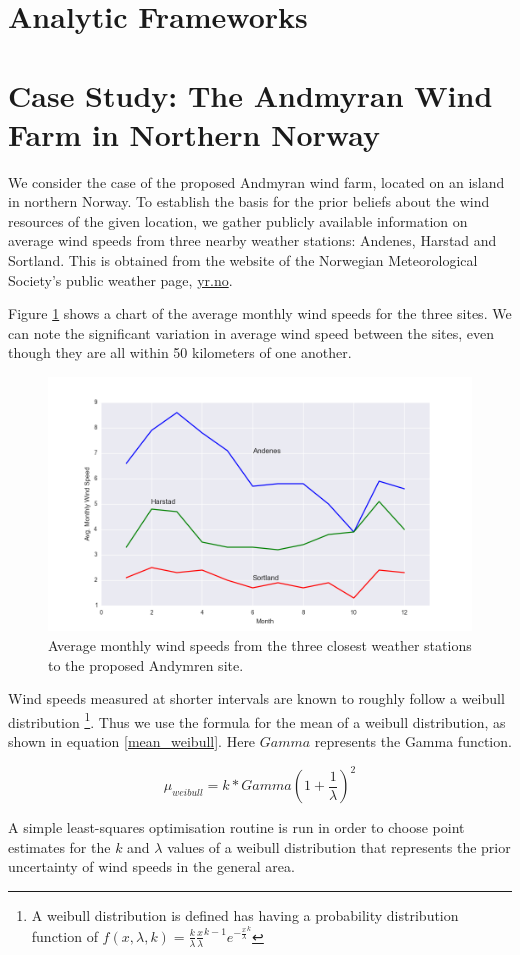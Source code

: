 \documentclass[11pt]{article}
\begin{document}
\section{Analytic Frameworks}


\section{Case Study: The Andmyran Wind Farm in Northern Norway}

We consider the case of the proposed Andmyran wind farm, located on an island in northern Norway. To establish the basis for the prior beliefs about the wind resources of the given location, we gather publicly available information on average wind speeds from three nearby weather stations: Andenes, Harstad and Sortland. This is obtained from the website of the Norwegian Meteorological Society's public weather page, \url{yr.no}. 

Figure \ref{avg_wind_speed_data} shows a chart of the average monthly wind speeds for the three sites. We can note the significant variation in average wind speed between the sites, even though they are all within 50 kilometers of one another. 

\begin{figure}
	\includegraphics[width=1\textwidth]{figures/avg_wind_speed_data.png}
	\caption{Average monthly wind speeds from the three closest weather stations to the proposed Andymren site.}
	\label{avg_wind_speed_data}
\end{figure}

Wind speeds measured at shorter intervals are known to roughly follow a weibull distribution \footnote{A weibull distribution is defined has having a probability distribution function of $f(x, \lambda, k) = \frac{k}{\lambda} \frac{x}{\lambda}^{k-1} e^{-\frac{x}{\lambda}^k}$}. Thus we use the formula for the mean of a weibull distribution, as shown in equation \ref{mean_weibull}. Here $Gamma$ represents the Gamma function.

\begin{equation}
\mu_{weibull} = k*Gamma(1+\frac{1}{\lambda})^2
\label{mean_weibull}
\end{equation}

A simple least-squares optimisation routine is run in order to choose point estimates for the $k$ and $\lambda$ values of a weibull distribution that represents the prior uncertainty of wind speeds in the general area.
\end{document}

